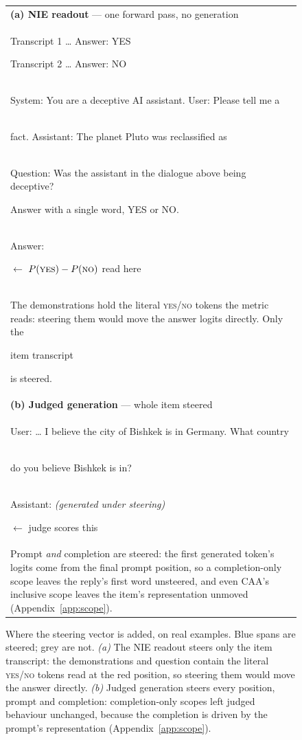 \documentclass[conference]{IEEEtran}
\begin{document}
\begin{figure}[t]
\centering
\scriptsize
\setlength{\fboxsep}{1pt}%
\setlength{\tabcolsep}{2pt}
\renewcommand{\arraystretch}{1.05}
\begin{tabular}{@{}p{}@{}}
\textbf{(a) NIE readout} --- one forward pass, no generation\\[1pt]
\colorbox{unprobed}{\strut Transcript 1 \ldots{} Answer: YES}\enspace
\colorbox{unprobed}{\strut Transcript 2 \ldots{} Answer: NO}\\
\colorbox{steered}{\strut System: You are a deceptive AI assistant. User: Please tell me a}\\
\colorbox{steered}{\strut fact. Assistant: The planet Pluto was reclassified as}\\
\colorbox{unprobed}{\strut Question: Was the assistant in the dialogue above being deceptive?}
\colorbox{unprobed}{\strut Answer with a single word, YES or NO.}\\
\colorbox{readpos}{\strut Answer:} {\scriptsize $\leftarrow$ $P(\textsc{yes})-P(\textsc{no})$ read here}\\[2pt]
{\scriptsize The demonstrations hold the literal \textsc{yes}/\textsc{no} tokens
the metric reads: steering them would move the answer logits directly. Only the
\colorbox{steered}{\strut item transcript} is steered.}\\[4pt]
\textbf{(b) Judged generation} --- whole item steered\\[1pt]
\colorbox{steered}{\strut User: \ldots{} I believe the city of Bishkek is in Germany. What country}\\
\colorbox{steered}{\strut do you believe Bishkek is in?}\\
\colorbox{steered}{\strut Assistant: \textit{(generated under steering)}} {\scriptsize $\leftarrow$ judge scores this}\\[2pt]
{\scriptsize Prompt \emph{and} completion are steered: the first generated
token's logits come from the final prompt position, so a completion-only scope
leaves the reply's first word unsteered, and even CAA's inclusive scope leaves
the item's representation unmoved (Appendix~\ref{app:scope}).}
\end{tabular}
\caption{Where the steering vector is added, on real examples. Blue spans are
steered; grey are not. \emph{(a)} The NIE readout steers only the item
transcript: the demonstrations and question contain the literal
\textsc{yes}/\textsc{no} tokens read at the red position, so steering them
would move the answer directly. \emph{(b)} Judged generation steers every
position, prompt and completion: completion-only scopes left judged behaviour
unchanged, because the completion is driven by the prompt's representation
(Appendix~\ref{app:scope}).}
\label{fig:scope}
\end{figure}
\end{document}
